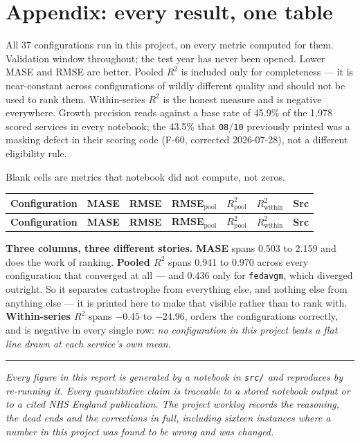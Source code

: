 \documentclass[11pt,a4paper]{article}
\newcommand{\keypoint}[1]{%
  \par\vspace{0.4em}%
  \noindent\colorbox{fed!8}{\parbox{0.98\textwidth}{\vspace{0.2em}#1\vspace{0.2em}}}%
  \par\vspace{0.4em}}
\begin{document}
\section{Appendix: every result, one table}

All 37 configurations run in this project, on every metric computed for them. Validation window
throughout; the test year has never been opened. Lower MASE and RMSE are better. Pooled $R^2$ is
included only for completeness --- it is near-constant across configurations of wildly different
quality and should not be used to rank them. Within-series $R^2$ is the honest measure and is negative
everywhere. Growth precision reads against a base rate of 45.9\% of the 1{,}978 scored services in
every notebook; the 43.5\% that \texttt{08}/\texttt{10} previously printed was a masking defect in
their scoring code (F-60, corrected 2026-07-28), not a different eligibility rule.

Blank cells are metrics that notebook did not compute, not zeros.

\begin{center}
\scriptsize
\begin{longtable}{@{}p{6.0cm}rrrrrl@{}}
\toprule
\textbf{Configuration} & \textbf{MASE} & \textbf{RMSE} & \textbf{RMSE$_{\text{pool}}$} & \textbf{$R^2_{\text{pool}}$} & \textbf{$R^2_{\text{within}}$} & \textbf{Src} \\
\endfirsthead
\toprule
\textbf{Configuration} & \textbf{MASE} & \textbf{RMSE} & \textbf{RMSE$_{\text{pool}}$} & \textbf{$R^2_{\text{pool}}$} & \textbf{$R^2_{\text{within}}$} & \textbf{Src} \\
\endhead
\bottomrule
\end{longtable}
\end{center}

\keypoint{\textbf{Three columns, three different stories.} \textbf{MASE} spans 0.503 to 2.159 and does
the work of ranking. \textbf{Pooled $R^2$} spans 0.941 to 0.970 across every configuration that
converged at all --- and 0.436 only for \texttt{fedavgm}, which diverged outright. So it separates
catastrophe from everything else, and nothing else from anything else --- it is printed here to make
that visible rather than to rank with.
\textbf{Within-series $R^2$} spans $-0.45$ to $-24.96$, orders the configurations correctly, and is
negative in every single row: \emph{no configuration in this project beats a flat line drawn at each
service's own mean}.}

\vspace{1em}
\hrule
\vspace{0.6em}
{\small\emph{Every figure in this report is generated by a notebook in \texttt{src/} and reproduces by
re-running it. Every quantitative claim is traceable to a stored notebook output or to a cited NHS
England publication. The project worklog records the reasoning, the dead ends and the corrections in
full, including sixteen instances where a number in this project was found to be wrong and was
changed.}}
\end{document}
